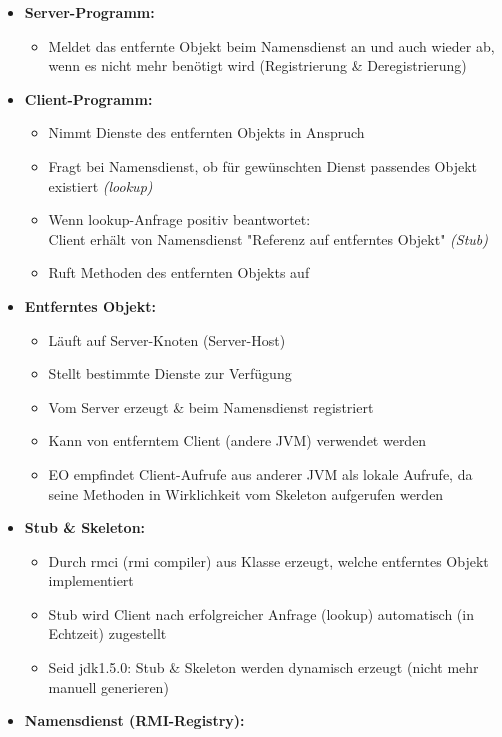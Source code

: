 \documentclass[a4paper]{article}
\begin{document}
		\begin{itemize}
			\item \textbf{Server-Programm:}
				\begin{itemize}
					\item Meldet das entfernte Objekt beim Namensdienst an und auch wieder ab, wenn es nicht mehr benötigt wird (Registrierung \& Deregistrierung)
				\end{itemize}
			\item \textbf{Client-Programm:}
				\begin{itemize}
					\item Nimmt Dienste des entfernten Objekts in Anspruch
					\item Fragt bei Namensdienst, ob für gewünschten Dienst passendes Objekt existiert \textit{(lookup)}
					\item Wenn lookup-Anfrage positiv beantwortet:\\
						Client erhält von Namensdienst "Referenz auf entferntes Objekt" \textit{(Stub)}
					\item Ruft Methoden des entfernten Objekts auf
				\end{itemize}
			\item \textbf{Entferntes Objekt:}
				\begin{itemize}
					\item Läuft auf Server-Knoten (Server-Host)
					\item Stellt bestimmte Dienste zur Verfügung
					\item Vom Server erzeugt \& beim Namensdienst registriert
					\item Kann von entferntem Client (andere JVM) verwendet werden
					\item EO empfindet Client-Aufrufe aus anderer JVM als lokale Aufrufe, da seine Methoden in Wirklichkeit vom Skeleton aufgerufen werden
				\end{itemize}
			\item \textbf{Stub \& Skeleton:}
				\begin{itemize}
					\item Durch rmci (rmi compiler) aus Klasse erzeugt, welche entferntes Objekt implementiert
					\item Stub wird Client nach erfolgreicher Anfrage (lookup) automatisch (in Echtzeit) zugestellt
					\item Seid jdk1.5.0: Stub \& Skeleton werden dynamisch erzeugt (nicht mehr manuell generieren)
				\end{itemize}
			\item \textbf{Namensdienst (RMI-Registry):}

\end{itemize}
\end{document}
